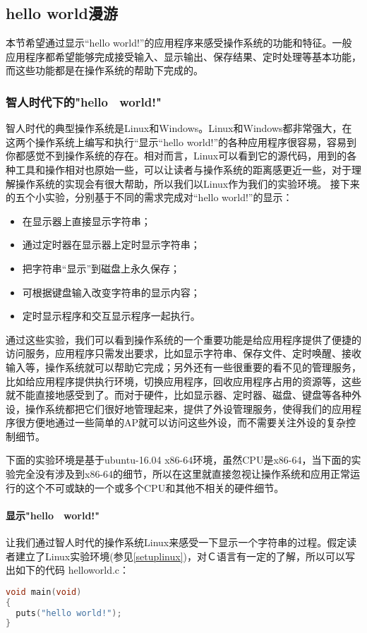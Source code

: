 \subsection{hello world漫游}

本节希望通过显示“hello world!”的应用程序来感受操作系统的功能和特征。一般应用程序都希望能够完成接受输入、显示输出、保存结果、定时处理等基本功能，而这些功能都是在操作系统的帮助下完成的。

\subsubsection{智人时代下的"hello　world!"}

智人时代的典型操作系统是Linux和Windows。Linux和Windows都非常强大，在这两个操作系统上编写和执行“显示“hello world!”的各种应用程序很容易，容易到你都感觉不到操作系统的存在。相对而言，Linux可以看到它的源代码，用到的各种工具和操作相对也原始一些，可以让读者与操作系统的距离感更近一些，对于理解操作系统的实现会有很大帮助，所以我们以Linux作为我们的实验环境。
接下来的五个小实验，分别基于不同的需求完成对“hello world!”的显示：
\begin{itemize}
	\item 在显示器上直接显示字符串；
	\item 通过定时器在显示器上定时显示字符串；
	\item 把字符串“显示”到磁盘上永久保存；
	\item 可根据键盘输入改变字符串的显示内容；
	\item 定时显示程序和交互显示程序一起执行。
\end{itemize}

通过这些实验，我们可以看到操作系统的一个重要功能是给应用程序提供了便捷的访问服务，应用程序只需发出要求，比如显示字符串、保存文件、定时唤醒、接收输入等，操作系统就可以帮助它完成；另外还有一些很重要的看不见的管理服务，比如给应用程序提供执行环境，切换应用程序，回收应用程序占用的资源等，这些就不能直接地感受到了。而对于硬件，比如显示器、定时器、磁盘、键盘等各种外设，操作系统都把它们很好地管理起来，提供了外设管理服务，使得我们的应用程序很方便地通过一些简单的AP就可以访问这些外设，而不需要关注外设的复杂控制细节。


\begin{note} 
下面的实验环境是基于ubuntu-16.04 x86-64环境，虽然CPU是x86-64，当下面的实验完全没有涉及到x86-64的细节，所以在这里就直接忽视让操作系统和应用正常运行的这个不可或缺的一个或多个CPU和其他不相关的硬件细节。
\end{note}

\paragraph{显示"hello　world!"}
让我们通过智人时代的操作系统Linux来感受一下显示一个字符串的过程。假定读者建立了Linux实验环境(参见\ref{setuplinux})，对Ｃ语言有一定的了解，所以可以写出如下的代码 helloworld.c：
\begin{lstlisting}[language={C}]
void main(void)
{
  puts("hello world!");
}
\end{lstlisting}

